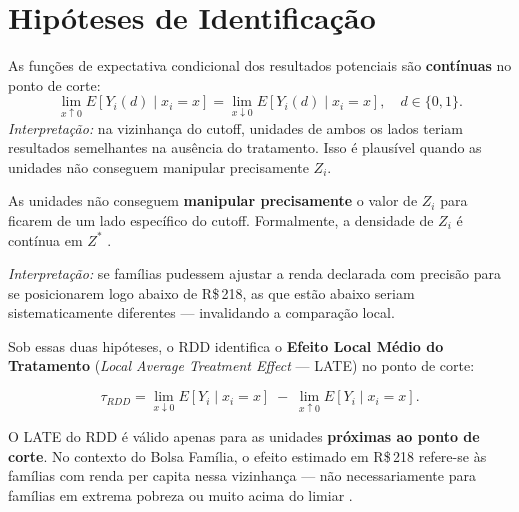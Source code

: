 \documentclass[12pt, a4paper, openany]{book}
\begin{document}
\section{Hip\'oteses de Identifica\c{c}\~ao}

\begin{hipotesebox}
As fun\c{c}\~oes de expectativa condicional dos resultados potenciais s\~ao \textbf{cont\'inuas} no ponto de corte:
\begin{equation}
  \lim_{x \uparrow 0} E[Y_i(d) \mid x_i = x] = \lim_{x \downarrow 0} E[Y_i(d) \mid x_i = x], \quad d \in \{0,1\}.
\end{equation}
\textit{Interpreta\c{c}\~ao:} na vizinhan\c{c}a do cutoff, unidades de ambos os lados teriam resultados semelhantes na aus\^encia do tratamento. Isso \'e plaus\'ivel quando as unidades n\~ao conseguem manipular precisamente $Z_i$.
\end{hipotesebox}

\begin{hipotesebox}
As unidades n\~ao conseguem \textbf{manipular precisamente} o valor de $Z_i$ para ficarem de um lado espec\'ifico do cutoff. Formalmente, a densidade de $Z_i$ \'e cont\'inua em $Z^*$ \citep{McCrary2008}.

\textit{Interpreta\c{c}\~ao:} se fam\'ilias pudessem ajustar a renda declarada com precis\~ao para se posicionarem logo abaixo de R\$\,218, as que est\~ao abaixo seriam sistematicamente diferentes --- invalidando a compara\c{c}\~ao local.
\end{hipotesebox}

Sob essas duas hip\'oteses, o RDD identifica o \textbf{Efeito Local M\'edio do Tratamento} (\textit{Local Average Treatment Effect} --- LATE) no ponto de corte:

\begin{equation}
  \tau_{RDD} = \lim_{x \downarrow 0} E[Y_i \mid x_i = x] \;-\; \lim_{x \uparrow 0} E[Y_i \mid x_i = x].
\end{equation}

\begin{notabox}
O LATE do RDD \'e v\'alido apenas para as unidades \textbf{pr\'oximas ao ponto de corte}. No contexto do Bolsa Fam\'ilia, o efeito estimado em R\$\,218 refere-se \`as fam\'ilias com renda per capita nessa vizinhan\c{c}a --- n\~ao necessariamente para fam\'ilias em extrema pobreza ou muito acima do limiar \citep{LeeLemieux2010}.
\end{notabox}
\end{document}
